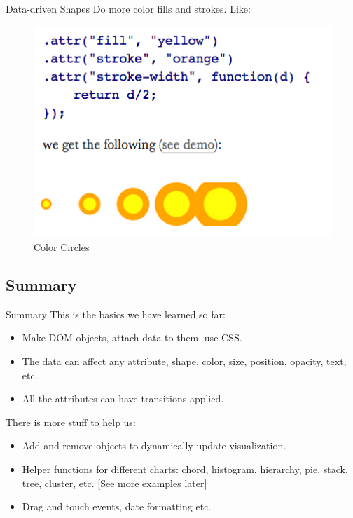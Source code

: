 \documentclass{beamer}
\begin{document}
\begin{frame}{Data-driven Shapes}
Do more color fills and strokes. Like:
\begin{figure}
\includegraphics[width=1.0\textwidth]{./images/color_circles.png}
\caption{\label{fig:colorcircles} Color Circles}
\end{figure}

\end{frame}

\subsection{Summary}

\begin{frame}{Summary} 
This is the basics we have learned so far:
\begin{itemize}
	\item Make DOM objects, attach data to them, use CSS.
	\item The data can affect any attribute, shape, color, size, position, opacity, text, etc.
	\item All the attributes can have transitions applied. 
\end{itemize}
\end{frame}

\begin{frame}
There is more stuff to help us:
\begin{itemize}
	\item Add and remove objects to dynamically update visualization.
	\item Helper functions for different charts: chord, histogram, hierarchy, pie, stack, tree, cluster, etc. [See more examples later]
	\item Drag and touch events, date formatting etc.
\end{itemize}
\end{frame}
\end{document}
